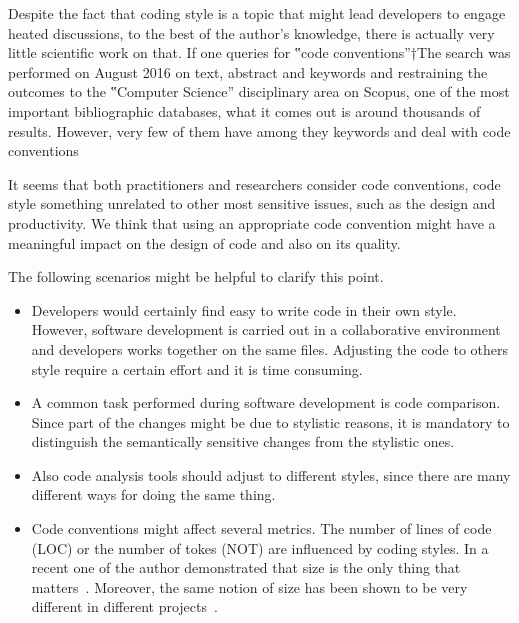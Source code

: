 Despite the fact that coding style is a topic that might lead developers to
engage heated discussions, to the best of the author's knowledge, there is
actually very little scientific work on that.  If one queries for ‟code
conventions”†{The search was performed on August 2016 on text, abstract and
keywords and restraining the outcomes to the ‟Computer Science” disciplinary
area} on Scopus, one of the most important
bibliographic databases, what it comes out is around thousands of results.
However, very few of them have  among they keywords and
deal with code conventions

It seems that both practitioners and researchers consider code conventions, code style
something unrelated to other most sensitive issues, such as the design and productivity.
We think that using an appropriate code convention might have a meaningful impact on the
design of code and also on its quality.

The following scenarios might be helpful to clarify this point.
\begin{itemize}
    \item Developers would certainly find easy to write code in their own style. However, software
    development is carried out in a collaborative environment and developers works together on
    the same files. Adjusting the code to others style require a certain effort and it is time consuming.
    \item A common task performed during software development is code comparison.
    Since part of the changes might be due to stylistic reasons, it is mandatory to distinguish the
    semantically sensitive changes from the stylistic ones.
    \item Also code analysis tools should adjust to different styles, since there are many
        different ways for doing the same thing.
    \item Code conventions might affect several metrics. The number of lines of code (LOC) or the number of
    tokes (NOT) are influenced by coding styles. In a recent one of the author demonstrated that size
      is the only thing that matters~\cite{Gil:Lalouche:16}.
      Moreover, the same notion of size has been shown to be very different in different projects~\cite{Gil:Lalouche:16}.
\end{itemize}

